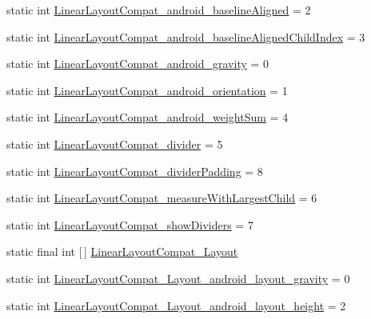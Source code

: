 \begin{DoxyCompactItemize}
\item 
static int \hyperlink{classandroid_1_1support_1_1design_1_1R_1_1styleable_a9d55bf7dbe65d98e7ba6f34b30430e6c}{Linear\+Layout\+Compat\+\_\+android\+\_\+baseline\+Aligned} = 2
\item 
static int \hyperlink{classandroid_1_1support_1_1design_1_1R_1_1styleable_a37112cf8a879aba4faa808e638c0f956}{Linear\+Layout\+Compat\+\_\+android\+\_\+baseline\+Aligned\+Child\+Index} = 3
\item 
static int \hyperlink{classandroid_1_1support_1_1design_1_1R_1_1styleable_a0c12043536404528247f7baea154f226}{Linear\+Layout\+Compat\+\_\+android\+\_\+gravity} = 0
\item 
static int \hyperlink{classandroid_1_1support_1_1design_1_1R_1_1styleable_af6d43237e69e14453825f99f1ca834ee}{Linear\+Layout\+Compat\+\_\+android\+\_\+orientation} = 1
\item 
static int \hyperlink{classandroid_1_1support_1_1design_1_1R_1_1styleable_a849b25d442594683c74cbb079d01e97c}{Linear\+Layout\+Compat\+\_\+android\+\_\+weight\+Sum} = 4
\item 
static int \hyperlink{classandroid_1_1support_1_1design_1_1R_1_1styleable_af717aeae3bc1ab1dd5fa67dd5dbcf7f4}{Linear\+Layout\+Compat\+\_\+divider} = 5
\item 
static int \hyperlink{classandroid_1_1support_1_1design_1_1R_1_1styleable_ab9d976c9fc0ba16e05e50c57f510e043}{Linear\+Layout\+Compat\+\_\+divider\+Padding} = 8
\item 
static int \hyperlink{classandroid_1_1support_1_1design_1_1R_1_1styleable_a5ea39aa0bc15c41a608e69496fecb711}{Linear\+Layout\+Compat\+\_\+measure\+With\+Largest\+Child} = 6
\item 
static int \hyperlink{classandroid_1_1support_1_1design_1_1R_1_1styleable_af92c8ae01241fac2f25cd795b2d750aa}{Linear\+Layout\+Compat\+\_\+show\+Dividers} = 7
\item 
static final int \mbox{[}$\,$\mbox{]} \hyperlink{classandroid_1_1support_1_1design_1_1R_1_1styleable_aa15b34677245387b51b9ce8ce236e56a}{Linear\+Layout\+Compat\+\_\+\+Layout}
\item 
static int \hyperlink{classandroid_1_1support_1_1design_1_1R_1_1styleable_aeb6df2bd39cf9d81ebdbc42ed612ef49}{Linear\+Layout\+Compat\+\_\+\+Layout\+\_\+android\+\_\+layout\+\_\+gravity} = 0
\item 
static int \hyperlink{classandroid_1_1support_1_1design_1_1R_1_1styleable_a7ea65ac14f1c9d58597ba9d8152990ea}{Linear\+Layout\+Compat\+\_\+\+Layout\+\_\+android\+\_\+layout\+\_\+height} = 2

\end{DoxyCompactItemize}
